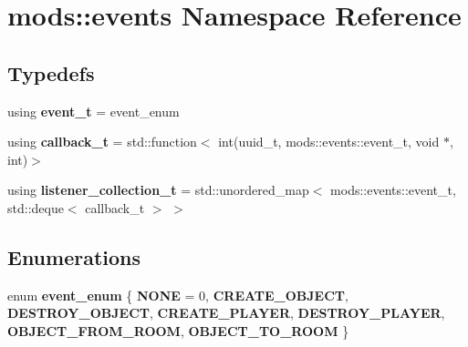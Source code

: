 \hypertarget{namespacemods_1_1events}{}\section{mods\+:\+:events Namespace Reference}
\label{namespacemods_1_1events}
\subsection*{Typedefs}
\begin{DoxyCompactItemize}
\item 
\mbox{\label{namespacemods_1_1events_a9a0bfac34cee6fba0537ec2fc44e39d7}} 
using {\bfseries event\+\_\+t} = event\+\_\+enum
\item 
\mbox{\label{namespacemods_1_1events_a25c0445c52014744935ec90acc8ac033}} 
using {\bfseries callback\+\_\+t} = std\+::function$<$ int(uuid\+\_\+t, mods\+::events\+::event\+\_\+t, void $\ast$, int)$>$
\item 
\mbox{\label{namespacemods_1_1events_ad5a08104a155aec2381672a1da839179}} 
using {\bfseries listener\+\_\+collection\+\_\+t} = std\+::unordered\+\_\+map$<$ mods\+::events\+::event\+\_\+t, std\+::deque$<$ callback\+\_\+t $>$ $>$
\end{DoxyCompactItemize}
\subsection*{Enumerations}
\begin{DoxyCompactItemize}
\item 
\mbox{\label{namespacemods_1_1events_a03502b9f101f2bbee980fd399f07ad18}} 
enum {\bfseries event\+\_\+enum} \{ \newline
{\bfseries N\+O\+NE} = 0, 
{\bfseries C\+R\+E\+A\+T\+E\+\_\+\+O\+B\+J\+E\+CT}, 
{\bfseries D\+E\+S\+T\+R\+O\+Y\+\_\+\+O\+B\+J\+E\+CT}, 
{\bfseries C\+R\+E\+A\+T\+E\+\_\+\+P\+L\+A\+Y\+ER}, 
\newline
{\bfseries D\+E\+S\+T\+R\+O\+Y\+\_\+\+P\+L\+A\+Y\+ER}, 
{\bfseries O\+B\+J\+E\+C\+T\+\_\+\+F\+R\+O\+M\+\_\+\+R\+O\+OM}, 
{\bfseries O\+B\+J\+E\+C\+T\+\_\+\+T\+O\+\_\+\+R\+O\+OM}
 \}
\end{DoxyCompactItemize}
